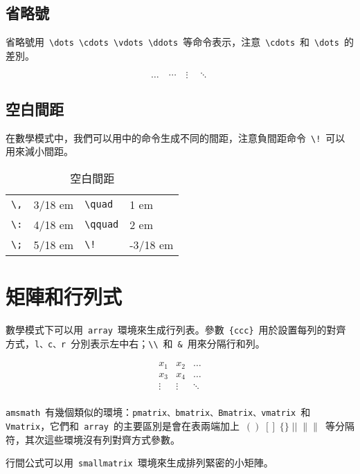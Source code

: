 \subsection{省略號}
省略號用~\verb|\dots \cdots \vdots \ddots|~等命令表示，注意~\verb|\cdots|~和~\verb|\dots|~的差別。
\begin{out}
\[\dots\quad \cdots\quad \vdots\quad \ddots\]
\end{out}

\subsection{空白間距}
在數學模式中，我們可以用中的命令生成不同的間距，注意負間距命令~\verb|\!|~可以用來減小間距。

\begin{table}[htbp]
\caption{空白間距}
\label{tab:quad}
\centering
\begin{tabular}{llll}
    \toprule
    \verb|\,| & 3/18 em & \verb|\quad|  & 1 em \\    
    \verb|\:| & 4/18 em & \verb|\qquad| & 2 em \\    
    \verb|\;| & 5/18 em & \verb|\!|     & -3/18 em \\
    \bottomrule
\end{tabular}
\end{table}

\section{矩陣和行列式}
數學模式下可以用~\verb|array|~環境來生成行列表。參數~\verb|{ccc}|~用於設置每列的對齊方式，\verb|l、c、r|~分別表示左中右；\verb|\\|~和~\verb|&|~用來分隔行和列。

\begin{demo}
\[\begin{array}{ccc}
x_1 & x_2 & \dots \\
x_3 & x_4 & \dots \\
\vdots & \vdots & \ddots \\
\end{array}\]
\end{demo}

\verb|amsmath|~有幾個類似的環境：\verb|pmatrix、bmatrix、Bmatrix、vmatrix|~和~
\verb|Vmatrix|，它們和~\verb|array|~的主要區別是會在表兩端加上~$()\; []\; \{\}\; ||\; \|\|$~等分隔符，其次這些環境沒有列對齊方式參數。

行間公式可以用~\verb|smallmatrix|~環境來生成排列緊密的小矩陣。

